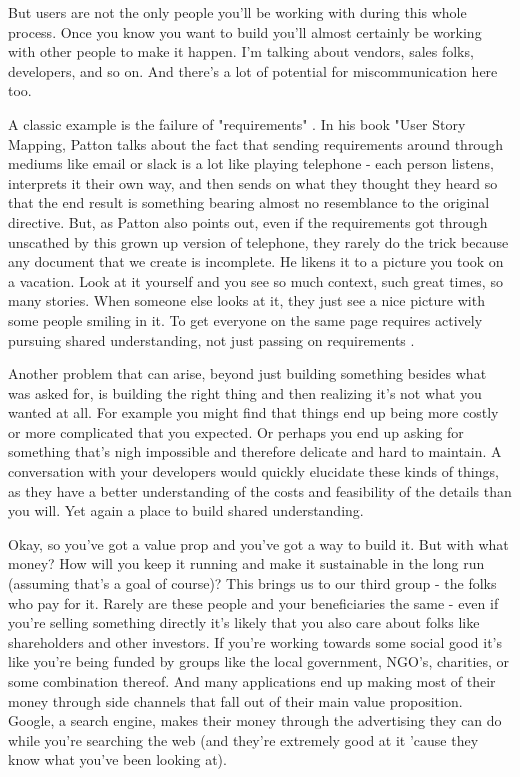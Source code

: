 \documentclass[11pt,a5paper]{book}
\begin{document}
But users are not the only people you'll be working with during this whole process. Once you know you want to build you'll almost certainly be working with other people to make it happen. I'm talking about vendors, sales folks, developers, and so on. And there's a lot of potential for miscommunication here too. 
\newline

A classic example is the failure of "requirements" \cite{patton}. In his book "User Story Mapping, Patton talks about the fact that sending requirements around through mediums like email or slack is a lot like playing telephone - each person listens, interprets it their own way, and then sends on what they thought they heard so that the end result is something bearing almost no resemblance to the original directive. But, as Patton also points out, even if the requirements got through unscathed by this grown up version of telephone, they rarely do the trick because any document that we create is incomplete. He likens it to a picture you took on a vacation. Look at it yourself and you see so much context, such great times, so many stories. When someone else looks at it, they just see a nice picture with some people smiling in it. To get everyone on the same page requires actively pursuing shared understanding, not just passing on requirements \cite{patton}.
\newline

Another problem that can arise, beyond just building something besides what was asked for, is building the right thing and then realizing it's not what you wanted at all. For example you might find that things end up being more costly or more complicated that you expected. Or perhaps you end up asking for something that's nigh impossible and therefore delicate and hard to maintain. A conversation with your developers would quickly elucidate these kinds of things, as they have a better understanding of the costs and feasibility of the details than you will. Yet again a place to build shared understanding.
\newline

Okay, so you've got a value prop and you've got a way to build it. But with what money? How will you keep it running and make it sustainable in the long run (assuming that's a goal of course)? This brings us to our third group - the folks who pay for it. Rarely are these people and your beneficiaries the same - even if you're selling something directly it's likely that you also care about folks like shareholders and other investors. If you're working towards some social good it's like you're being funded by groups like the local government, NGO's, charities, or some combination thereof. And many applications end up making most of their money through side channels that fall out of their main value proposition. Google, a search engine, makes their money through the advertising they can do while you're searching the web (and they're extremely good at it 'cause they know what you've been looking at). 
\newline
\end{document}
